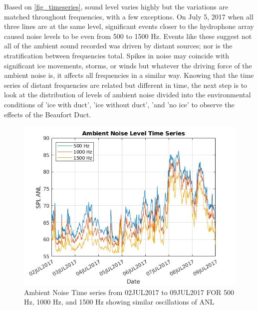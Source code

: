 Based on \autoref{fig_timeseries}, sound level varies highly but the variations are matched throughout frequencies, with a few exceptions. On July 5,  2017 when all three lines are at the same level, significant events closer to the hydrophone array caused noise levels to be even from 500 to 1500 Hz. Events like these suggest not all of the ambient sound recorded was driven by distant sources; nor is the stratification between frequencies total. Spikes in noise may coincide with significant ice movements, storms, or winds but whatever the driving force of the ambient noise is, it affects all frequencies in a similar way. Knowing that the time series of distant frequencies are related but different in time, the next step is to look at the distribution of levels of ambient noise divided into the environmental conditions of 'ice with duct', 'ice without duct', 'and 'no ice' to observe the effects of the Beaufort Duct.


\begin{figure}[ht]
\centering
\includegraphics[scale=0.6]{Figures/timeseries_500_1500_july_overlay.jpg}
\caption{Ambient Noise Time series from 02JUL2017 to 09JUL2017 FOR 500 Hz, 1000 Hz, and 1500 Hz showing similar oscillations of ANL}
\label{fig_timeseries}
\end{figure}





